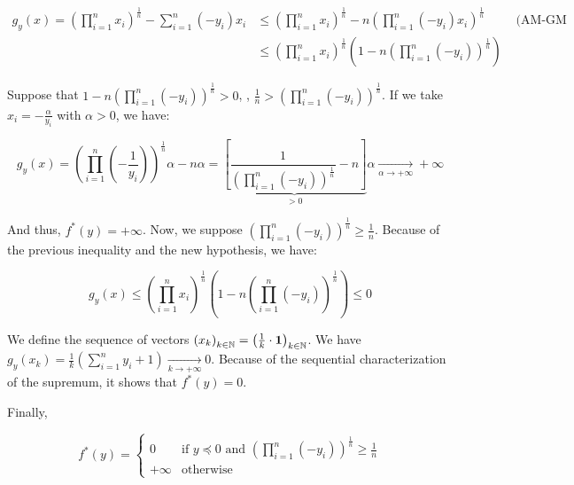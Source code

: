 \documentclass[a4paper, 11pt]{report}
\begin{document}
\begin{itemize}
    \begin{equation*}
        \begin{aligned}
            g_{y}(x) = \left( \prod_{i=1}^{n} x_{i} \right)^{\frac{1}{n}} - \sum_{i=1}^{n} \left( - y_{i} \right) x_{i} &\leq \left( \prod_{i=1}^{n} x_{i} \right)^{\frac{1}{n}} - n \left( \prod_{i=1}^{n} \left( - y_{i} \right) x_{i} \right)^{\frac{1}{n}} &\text{ (AM-GM inequality) } \\
            &\leq \left( \prod_{i=1}^{n} x_{i} \right)^{\frac{1}{n}} \left( 1 - n \left( \prod_{i=1}^{n} \left( - y_{i} \right) \right)^{\frac{1}{n}} \right) &
        \end{aligned}
    \end{equation*}
    
    Suppose that $1 - n \left( \prod_{i=1}^{n} \left( - y_{i} \right) \right)^{\frac{1}{n}} > 0$, \ie, $\frac{1}{n} > \left( \prod_{i=1}^{n} \left( - y_{i} \right) \right)^{\frac{1}{n}}$. If we take $x_{i} = - \frac{\alpha}{y_{i}}$ with $\alpha > 0$, we have:
    
    \[ g_{y}(x) = \left( \prod_{i=1}^{n} \left( - \frac{1}{y_{i}} \right) \right)^{\frac{1}{n}} \alpha - n \alpha = \underbrace{\left[ \frac{1}{\left( \prod_{i=1}^{n} \left( - y_{i} \right) \right)^{\frac{1}{n}}} - n \right]}_{> 0} \alpha \underset{\alpha \rightarrow + \infty}{\longrightarrow} + \infty \]
    
    And thus, $f^{*}(y) = + \infty$. Now, we suppose $\left( \prod_{i=1}^{n} \left( - y_{i} \right) \right)^{\frac{1}{n}} \geq \frac{1}{n}$. Because of the previous inequality and the new hypothesis, we have:
    
    \[ g_{y}(x) \leq \left( \prod_{i=1}^{n} x_{i} \right)^{\frac{1}{n}} \left( 1 - n \left( \prod_{i=1}^{n} \left( - y_{i} \right) \right)^{\frac{1}{n}} \right) \leq 0 \]
    
    We define the sequence of vectors $\left( x_{k} \right)_{k \in \mathbb{N}} = \left( \frac{1}{k} \cdot \mathbf{1} \right)_{k \in \mathbb{N}}$. We have $g_{y} \left( x_{k} \right) = \frac{1}{k} \left( \sum_{i=1}^{n} y_{i} + 1 \right) \underset{k \rightarrow + \infty}{\longrightarrow} 0$. Because of the sequential characterization of the supremum, it shows that $f^{*}(y) = 0$.
    
    Finally,
    
    \[ \boxed{f^{*}(y) = 
    \begin{cases}
        0 & \text{if } y \preceq 0 \text{ and } \left( \prod_{i=1}^{n} \left( - y_{i} \right) \right)^{\frac{1}{n}} \geq \frac{1}{n} \\
        + \infty & \text{otherwise }
    \end{cases}} \]
    

\end{itemize}
\end{document}
